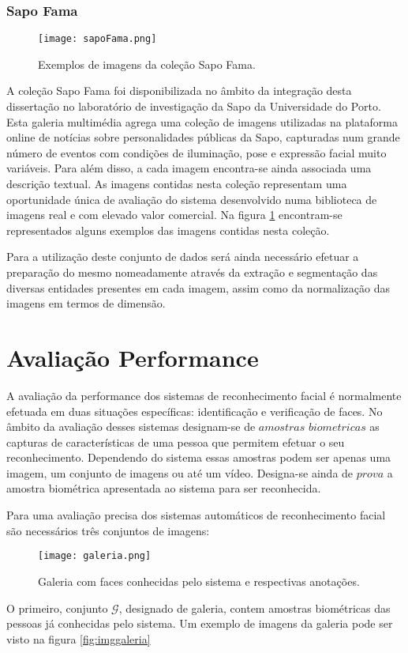\subsubsection{Sapo Fama}
\begin{figure}[ht]
  \begin{center}
    \leavevmode
    \texttt{[image: sapoFama.png]}
    \caption{Exemplos de imagens da coleção Sapo Fama.}	
    \label{fig:sapoFama}
  \end{center}
\end{figure}
A coleção Sapo Fama foi disponibilizada no âmbito da integração desta dissertação no laboratório de investigação da Sapo da Universidade do Porto. Esta galeria multimédia agrega uma coleção de imagens utilizadas na plataforma online de notícias sobre personalidades públicas da Sapo, capturadas num grande número de eventos com condições de iluminação, pose e expressão facial muito variáveis. Para além disso, a cada imagem encontra-se ainda associada uma descrição textual. As imagens contidas nesta coleção representam uma oportunidade única de avaliação do sistema desenvolvido numa biblioteca de imagens real e com elevado valor comercial. Na figura \ref{fig:sapoFama} encontram-se representados alguns exemplos das imagens contidas nesta coleção.

Para a utilização deste conjunto de dados será ainda necessário efetuar a preparação do mesmo nomeadamente através da extração e segmentação das diversas entidades presentes em cada imagem, assim como da normalização das imagens em termos de dimensão.

\section{Avaliação Performance}
A avaliação da performance dos sistemas de reconhecimento facial é normalmente efetuada em duas situações específicas: identificação e verificação de faces. No âmbito da avaliação desses sistemas designam-se de $amostras$ $biometricas$ as capturas de características de uma pessoa que permitem efetuar o seu reconhecimento. Dependendo do sistema essas amostras podem ser apenas uma imagem, um conjunto de imagens ou até um vídeo. Designa-se ainda de $prova$ a amostra biométrica apresentada ao sistema para ser reconhecida.

Para uma avaliação precisa dos sistemas automáticos de reconhecimento facial são necessários três conjuntos de imagens:
\begin{figure}[ht]
  \begin{center}
    \leavevmode
    \texttt{[image: galeria.png]}
    \caption{Galeria com faces conhecidas pelo sistema e respectivas anotações.}	
    \label{fig:galeria}
  \end{center}
\end{figure}
O primeiro, conjunto $\mathscr{G}$, designado de galeria, contem amostras biométricas das pessoas já conhecidas pelo sistema. Um exemplo de imagens da galeria pode ser visto na figura \ref{fig:imggaleria}

